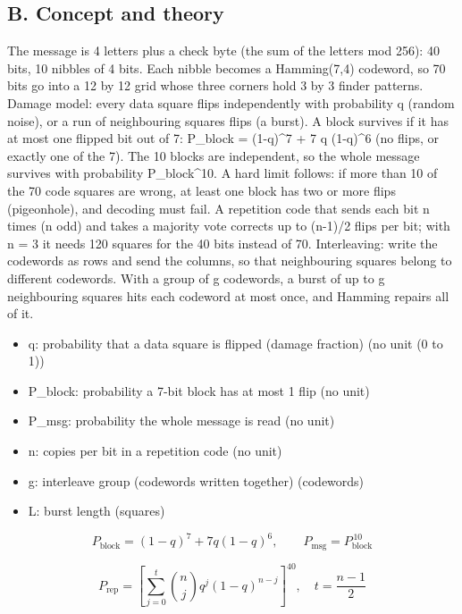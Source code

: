 \documentclass[11pt,a4paper]{article}
\begin{document}
\subsection*{B. Concept and theory}
The message is 4 letters plus a check byte (the sum of the letters mod 256): 40 bits, 10 nibbles of 4 bits. Each nibble becomes a Hamming(7,4) codeword, so 70 bits go into a 12 by 12 grid whose three corners hold 3 by 3 finder patterns. Damage model: every data square flips independently with probability q (random noise), or a run of neighbouring squares flips (a burst). A block survives if it has at most one flipped bit out of 7: P\_block = (1-q)\textasciicircum{}7 + 7 q (1-q)\textasciicircum{}6 (no flips, or exactly one of the 7). The 10 blocks are independent, so the whole message survives with probability P\_block\textasciicircum{}10. A hard limit follows: if more than 10 of the 70 code squares are wrong, at least one block has two or more flips (pigeonhole), and decoding must fail. A repetition code that sends each bit n times (n odd) and takes a majority vote corrects up to (n-1)/2 flips per bit; with n = 3 it needs 120 squares for the 40 bits instead of 70. Interleaving: write the codewords as rows and send the columns, so that neighbouring squares belong to different codewords. With a group of g codewords, a burst of up to g neighbouring squares hits each codeword at most once, and Hamming repairs all of it.

\begin{itemize}[nosep]
\item q: probability that a data square is flipped (damage fraction) (no unit (0 to 1))
\item P\_block: probability a 7-bit block has at most 1 flip (no unit)
\item P\_msg: probability the whole message is read (no unit)
\item n: copies per bit in a repetition code (no unit)
\item g: interleave group (codewords written together) (codewords)
\item L: burst length (squares)
\end{itemize}

\begin{equation*}
P_{\text{block}}=(1-q)^7+7q(1-q)^6,\qquad P_{\text{msg}}=P_{\text{block}}^{\,10}
\end{equation*}

\begin{equation*}
P_{\text{rep}}=\left[\sum_{j=0}^{t}\binom{n}{j}q^j(1-q)^{n-j}\right]^{40},\quad t=\frac{n-1}{2}
\end{equation*}
\end{document}
